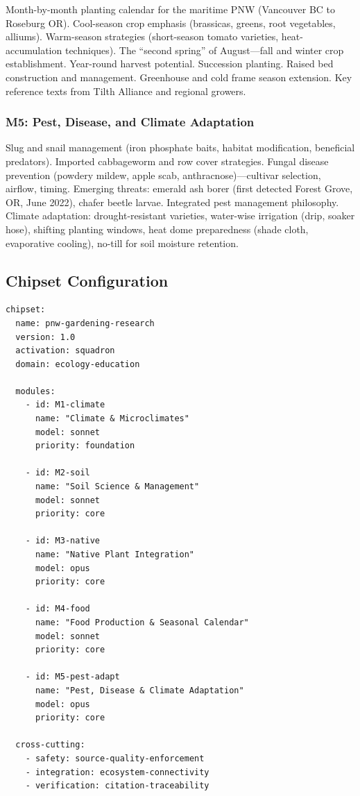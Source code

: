 \documentclass[11pt,letterpaper]{article}
\begin{document}
Month-by-month planting calendar for the maritime PNW (Vancouver BC to Roseburg OR). Cool-season crop emphasis (brassicas, greens, root vegetables, alliums). Warm-season strategies (short-season tomato varieties, heat-accumulation techniques). The ``second spring'' of August---fall and winter crop establishment. Year-round harvest potential. Succession planting. Raised bed construction and management. Greenhouse and cold frame season extension. Key reference texts from Tilth Alliance and regional growers.

\subsubsection{M5: Pest, Disease, and Climate Adaptation}

Slug and snail management (iron phosphate baits, habitat modification, beneficial predators). Imported cabbageworm and row cover strategies. Fungal disease prevention (powdery mildew, apple scab, anthracnose)---cultivar selection, airflow, timing. Emerging threats: emerald ash borer (first detected Forest Grove, OR, June 2022), chafer beetle larvae. Integrated pest management philosophy. Climate adaptation: drought-resistant varieties, water-wise irrigation (drip, soaker hose), shifting planting windows, heat dome preparedness (shade cloth, evaporative cooling), no-till for soil moisture retention.

\subsection{Chipset Configuration}

\begin{asciibox}
\begin{verbatim}
chipset:
  name: pnw-gardening-research
  version: 1.0
  activation: squadron
  domain: ecology-education

  modules:
    - id: M1-climate
      name: "Climate & Microclimates"
      model: sonnet
      priority: foundation

    - id: M2-soil
      name: "Soil Science & Management"
      model: sonnet
      priority: core

    - id: M3-native
      name: "Native Plant Integration"
      model: opus
      priority: core

    - id: M4-food
      name: "Food Production & Seasonal Calendar"
      model: sonnet
      priority: core

    - id: M5-pest-adapt
      name: "Pest, Disease & Climate Adaptation"
      model: opus
      priority: core

  cross-cutting:
    - safety: source-quality-enforcement
    - integration: ecosystem-connectivity
    - verification: citation-traceability
\end{verbatim}
\end{asciibox}
\end{document}
